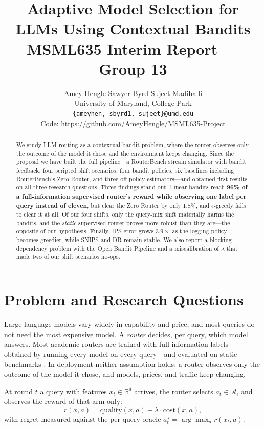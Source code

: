 \documentclass[10pt,twocolumn]{article}
\title{\vspace{-2.2em}\textbf{Adaptive Model Selection for LLMs Using Contextual
Bandits}\\[0.2em]\large MSML635 Interim Report --- Group 13}
\author{Amey Hengle \quad Sawyer Byrd \quad Sujeet Madihalli\\
\small University of Maryland, College Park\\
\small \texttt{\{ameyhen, sbyrd1, sujeet\}@umd.edu}\\
\small Code: \url{https://github.com/AmeyHengle/MSML635-Project}}
\date{}
\newcommand{\lam}{\lambda}
\begin{document}
\maketitle

\begin{abstract}
\noindent
We study LLM routing as a contextual bandit problem, where the router observes
only the outcome of the model it chose and the environment keeps changing. Since
the proposal we have built the full pipeline---a RouterBench stream simulator
with bandit feedback, four scripted shift scenarios, four bandit policies, six
baselines including RouterBench's Zero Router, and three off-policy
estimators---and obtained first results on all three research questions. Three
findings stand out. Linear bandits reach \textbf{96\% of a full-information
supervised router's reward while observing one label per query instead of
eleven}, but clear the Zero Router by only 1.8\%, and $\epsilon$-greedy fails to
clear it at all. Of our four shifts, only the query-mix shift materially harms
the bandits, and the \emph{static} supervised router proves more robust than
they are---the opposite of our hypothesis. Finally, IPS error grows
$3.9\times$ as the logging policy becomes greedier, while SNIPS and DR remain
stable. We also report a blocking dependency problem with the Open Bandit
Pipeline and a miscalibration of $\lam$ that made two of our shift scenarios
no-ops.
\end{abstract}

\section{Problem and Research Questions}

Large language models vary widely in capability and price, and most queries do
not need the most expensive model. A \emph{router} decides, per query, which
model answers. Most academic routers are trained with full-information
labels---obtained by running every model on every query---and evaluated on
static benchmarks \citep{hu2024routerbench,lu2026routerarena}. In deployment
neither assumption holds: a router observes only the outcome of the model it
chose, and models, prices, and traffic keep changing.

At round $t$ a query with features $x_t \in \mathbb{R}^d$ arrives, the router
selects $a_t \in \mathcal{A}$, and observes the reward of that arm only:
\begin{equation}
r(x,a) = \mathrm{quality}(x,a) - \lam \cdot \mathrm{cost}(x,a),
\label{eq:reward}
\end{equation}
with regret measured against the per-query oracle
$a^\star_t = \arg\max_a r(x_t,a)$.
\end{document}
